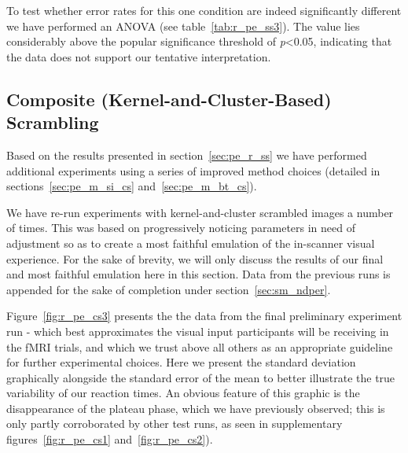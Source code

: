 	    To test whether error rates for this one condition are indeed significantly different we have performed an ANOVA (see table~\ref{tab:r_pe_ss3}).
	    The value lies considerably above the popular significance threshold of \textit{p}<0.05, indicating that the data does not support our tentative interpretation.
	\subsection{Composite (Kernel-and-Cluster-Based) Scrambling}\label{sec:pe_r_cs}
	    Based on the results presented in section~\ref{sec:pe_r_ss} we have performed additional experiments using a series of improved method choices (detailed in sections~\ref{sec:pe_m_si_cs} and~\ref{sec:pe_m_bt_cs}).
	    
	    We have re-run experiments with kernel-and-cluster scrambled images a number of times.
	    This was based on progressively noticing parameters in need of adjustment so as to create a most faithful emulation of the in-scanner visual experience.
	    For the sake of brevity, we will only discuss the results of our final and most faithful emulation here in this section.
	    Data from the previous runs is appended for the sake of completion under section~\ref{sec:sm_ndper}.
	     
	    
	    Figure~\ref{fig:r_pe_cs3} presents the the data from the final preliminary experiment run - which best approximates the visual input participants will be receiving in the fMRI trials, and which we trust above all others as an appropriate guideline for further experimental choices.
	    Here we present the standard deviation graphically alongside the standard error of the mean to better illustrate the true variability of our reaction times.
	    An obvious feature of this graphic is the disappearance of the plateau phase, which we have previously observed; this is only partly corroborated by other test runs, as seen in supplementary figures~\ref{fig:r_pe_cs1} and~\ref{fig:r_pe_cs2}).
	    
